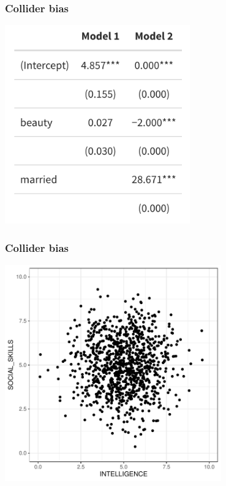 \documentclass[aspectratio=43]{beamer}
\begin{document}
\begin{frame}
\frametitle{Collider bias}
\centering

\includegraphics[width = 0.6\textwidth]{../img/collider_m2}

\end{frame}

\begin{frame}
\frametitle{Collider bias}
\centering

\includegraphics[width = 0.7\textwidth]{../img/collider1}

\end{frame}
\end{document}
